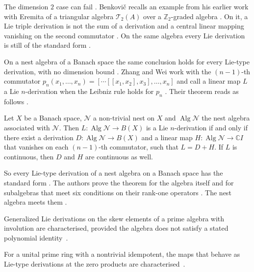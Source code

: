 The dimension $2$ case can fail \cite[p.~163]{Benkovic2015}. Benkovič recalls
an example from his earlier work with Eremita of a triangular algebra
$\mathcal{T}_{2}(A)$ over a $\mathbb{Z}_{2}$-graded algebra
\cite[p.~163]{Benkovic2015}. On it, a Lie triple derivation is not the sum of
a derivation and a central linear mapping vanishing on the second commutator
\cite[p.~163]{Benkovic2015}. On the same algebra every Lie derivation is still
of the standard form \cite[p.~164]{Benkovic2015}.

On a nest algebra of a Banach space the same conclusion holds for every
Lie-type derivation, with no dimension bound \cite[Theorem~3.1,
p.~397]{ZhangWei2017Nest}. Zhang and Wei work with the $(n-1)$-th commutator
$p_n(x_1,\dots,x_n)=[\cdots[[x_1,x_2],x_3],\dots,x_n]$ and call a linear map
$L$ a Lie $n$-derivation when the Leibniz rule holds for $p_n$
\cite[p.~2]{ZhangWei2017Nest}. Their theorem reads as follows
\cite[Theorem~3.1, p.~397]{ZhangWei2017Nest}.

\begin{theorem}\label{thm:lie:zhang-wei-nest}
Let $X$ be a Banach space, $\mathcal{N}$ a non-trivial nest on $X$ and
$\operatorname{Alg}\mathcal{N}$ the nest algebra associated with $\mathcal{N}$.
Then $L\colon\operatorname{Alg}\mathcal{N}\to B(X)$ is a Lie $n$-derivation if
and only if there exist a derivation $D\colon\operatorname{Alg}\mathcal{N}\to B(X)$
and a linear map $H\colon\operatorname{Alg}\mathcal{N}\to\mathbb{C}I$ that
vanishes on each $(n-1)$-th commutator, such that $L=D+H$. If $L$ is continuous,
then $D$ and $H$ are continuous as well.
\end{theorem}

So every Lie-type derivation of a nest algebra on a Banach space has the
standard form \cite[p.~3]{ZhangWei2017Nest}. The authors prove the theorem for
the algebra itself and for subalgebras that meet six conditions on their
rank-one operators \cite[pp.~6--7]{ZhangWei2017Nest}. The nest algebra meets
them \cite[p.~7]{ZhangWei2017Nest}.

Generalized Lie derivations on the skew elements of a prime algebra with
involution are characterised, provided the algebra does not satisfy a stated
polynomial identity~\cite{WlGeneralizedLieDerivationsOnSke2011}.

For a unital prime ring with a nontrivial idempotent, the maps that behave as
Lie-type derivations at the zero products are
characterised~\cite{WlOnLieTypeDerivationsOfRingsAnd2019}.
